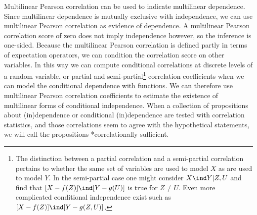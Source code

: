 \documentclass[
  letterpaper,
  DIV=11,
  numbers=noendperiod]{scrreprt}
\begin{document}
Multilinear Pearson correlation can be used to indicate multilinear
dependence. Since multilinear dependence is mutually exclusive with
independence, we can use multilinear Pearson correlation as evidence of
dependence. A multilinear Pearson correlation score of zero does not
imply independence however, so the inference is one-sided. Because the
multilinear Pearson correlation is defined partly in terms of
expectation operators, we can condition the correlation score on other
variables. In this way we can compute conditional correlations at
discrete levels of a random variable, or partial and
semi-partial\footnote{The distinction between a partial correlation and a semi-partial correlation pertains to whether the same set of variables are used to model $X$ as are used to model $Y$. In the semi-partial case one might consider  $X \ind Y | Z,U$ and find that $[X - f(Z)] \ind [Y -  g(U)]$ is true for $Z \neq U$. Even more complicated conditional independence exist such as $[X - f(Z)] \ind [Y -  g(Z,U)]$.}
correlation coefficients when we can model the conditional dependence
with functions. We can therefore use multilinear Pearson correlation
coefficients to estimate the existence of multilinear forms of
conditional independence. When a collection of propositions about
(in)dependence or conditional (in)dependence are tested with correlation
statistics, and those correlations seem to agree with the hypothetical
statements, we will call the propositions *correlationally sufficient.
\end{document}
